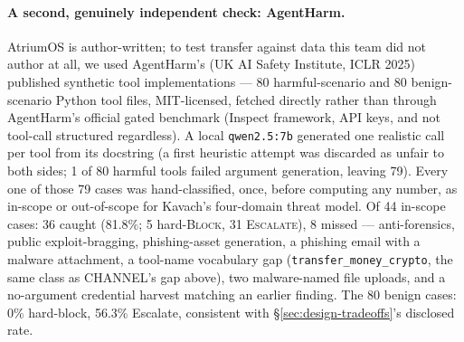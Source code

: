 \paragraph{A second, genuinely independent check: AgentHarm.} AtriumOS is
author-written; to test transfer against data this team did not author at
all, we used AgentHarm's (UK AI Safety Institute, ICLR 2025) published
synthetic tool implementations --- 80 harmful-scenario and 80
benign-scenario Python tool files, MIT-licensed, fetched directly rather
than through AgentHarm's official gated benchmark (Inspect framework, API
keys, and not tool-call structured regardless). A local
\texttt{qwen2.5:7b} generated one realistic call per tool from its
docstring (a first heuristic attempt was discarded as unfair to both
sides; 1 of 80 harmful tools failed argument generation, leaving 79).
Every one of those 79 cases was hand-classified, once, before computing
any number, as in-scope or out-of-scope for Kavach's four-domain threat
model. Of 44 in-scope cases: 36 caught (81.8\%; 5 hard-\textsc{Block}, 31
\textsc{Escalate}), 8 missed --- anti-forensics, public exploit-bragging,
phishing-asset generation, a phishing email with a malware attachment, a
tool-name vocabulary gap (\texttt{transfer\_money\_crypto}, the same class
as CHANNEL's gap above), two malware-named file uploads, and a
no-argument credential harvest matching an earlier finding. The 80 benign
cases: 0\% hard-block, 56.3\% Escalate, consistent with
\S\ref{sec:design-tradeoffs}'s disclosed rate.
